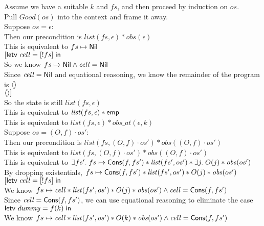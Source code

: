 \begin{tabbedproof}
\oo Assume we have a suitable $k$ and $fs$, and then proceed by induction on $os$.  \\
\oo Pull $\mathit{Good}(os)$ into the context and frame it away. \\
\oo Suppose $os = \epsilon$:  \\
\ooo Then our precondition is $\mathit{list}(fs, \epsilon) * \mathit{obs}(\epsilon)$ \\
\ooo This is equivalent to $fs \mapsto \mathsf{Nil}$ \\
\ooo $[\mathsf{letv}\;\mathit{cell} = [!fs]\;\mathsf{in}\;$  \\
\ooo So we know $fs \mapsto \mathsf{Nil} \land \mathit{cell} = \mathsf{Nil}$ \\
\ooo Since $\mathit{cell} = \mathsf{Nil}$ and equational reasoning, we know the remainder of the program is $\left<\right>$\\
\ooo $\left<\right>]$ \\
\ooo So the state is still $\mathit{list}(fs, \epsilon)$ \\
\ooo This is equivalent to $\mathit{list}(fs, \epsilon) * \mathsf{emp}$ \\
\ooo This is equivalent to $\mathit{list}(fs, \epsilon) * \mathit{obs\_at}(\epsilon, k)$ \\
\oo Suppose $os = (O,f) \cdot os'$:  \\
\ooo Then our precondition is $\mathit{list}(fs, (O,f) \cdot os') * \mathit{obs}((O,f)\cdot os')$ \\
\ooo This is equivalent to $\mathit{list}(fs, (O,f) \cdot os') * \mathit{obs}((O,f)\cdot os')$ \\
\ooo This is equivalent to $\exists fs'.\; fs \mapsto \mathsf{Cons}(f, fs') * \mathit{list}(fs',  os') * \exists j.\;O(j) * \mathit{obs}( os')$ \\
\ooo By dropping existentials, $fs \mapsto \mathsf{Cons}(f, fs') * \mathit{list}(fs',  os') * O(j) * \mathit{obs}( os')$ \\
\ooo $[\mathsf{letv}\;\mathit{cell} = [!fs]\;\mathsf{in}\;$ \\
\ooo We know $fs \mapsto \mathit{cell}  * \mathit{list}(fs',  os') * O(j) * \mathit{obs}( os') \land \mathit{cell} = \mathsf{Cons}(f, fs')$ \\
\ooo Since $\mathit{cell} = \mathsf{Cons}(f, fs')$, we can use equational reasoning to eliminate the case \\
\ooo $\mathsf{letv}\;\mathit{dummy} = f(k)\;\mathsf{in}\;$ \\
\ooo We know $fs \mapsto \mathit{cell}  * \mathit{list}(fs',  os') * O(k) * \mathit{obs}( os') \land \mathit{cell} = \mathsf{Cons}(f, fs')$ \\

\end{tabbedproof}
